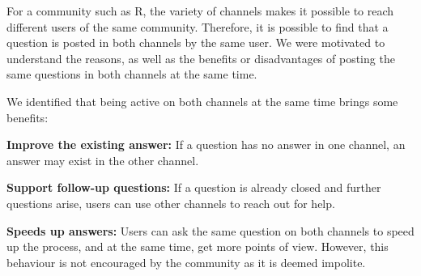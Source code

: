 \documentclass{sig-alternate-05-2015}
\begin{document}
	For a community such as R, the variety of channels makes it possible to reach different users of the same community.
	Therefore, it is possible to find that a question is posted in both channels by the same user.
	We were motivated to understand the reasons, as well as the benefits or disadvantages of posting the same questions in both channels at the same time.

	We identified that being active on both channels at the same time brings some benefits:
	\begin{packed_enum}
		\item \textbf{Improve the existing answer:} If a question has no answer in one channel, an answer may exist in the other channel.
		\item \textbf{Support follow-up questions:} If a question is already closed and further questions arise, users can use other channels to reach out for help.
		\item \textbf{Speeds up answers:} Users can ask the same question on both channels to speed up the process, and at the same time, get more points of view. However, this behaviour is not encouraged by the community as it is deemed impolite.
	\end{packed_enum}




\end{document}
